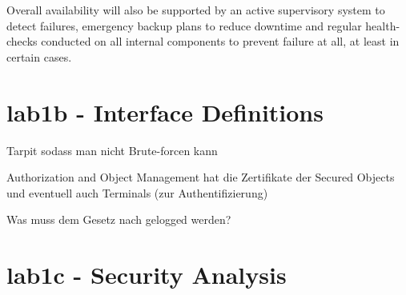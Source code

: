 \documentclass[12pt,a4paper,titlepage,oneside]{scrartcl}
\begin{document}
Overall availability will also be supported by an active supervisory system to detect failures, emergency backup plans to reduce downtime
and regular health-checks conducted on all internal components to prevent failure at all, at least in certain cases.


\section{lab1b - Interface Definitions}

Tarpit sodass man nicht Brute-forcen kann

Authorization and Object Management hat die Zertifikate der Secured Objects und eventuell auch Terminals (zur Authentifizierung)

Was muss dem Gesetz nach gelogged werden?





\section{lab1c - Security Analysis}


%
%
\end{document}
